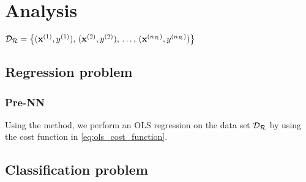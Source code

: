 \section{Analysis}\label{sec:analysis}


$\mathcal{D}_\mathcal{R} = \big\{ (\mathbf{x}^{(1)}, y^{(1)}), \,  (\mathbf{x}^{(2)}, y^{(2)}), \,\dots, \, (\mathbf{x}^{({n_\mathcal{R}})}, y^{(n_\mathcal{R})}) \big\}$ 


\subsection{Regression problem}\label{sec:analysis_regression}

    \subsubsection{Pre-NN}\label{sec:analysis_regressoin_preNN}

    Using the  method, we perform an OLS regression on the data set $\mathcal{D}_\mathcal{R}$ by using the cost function in \ref{eq:ols_cost_function}.




\subsection{Classification problem}\label{sec:analysis_classification}

